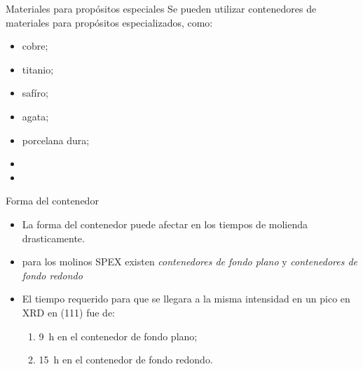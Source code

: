 \documentclass[%
spanish,
progressbar=head,
background=dark,
subsectionpage
]{beamer}
\begin{document}
\begin{frame}{Materiales para propósitos especiales}
    Se pueden utilizar contenedores de materiales para propósitos especializados, como:
    \begin{itemize}
        \item cobre;
        \item titanio;
        \item safíro;
        \item agata;
        \item porcelana dura;
        \item {}
        \item {}
    \end{itemize}
\end{frame}

\begin{frame}{Forma del contenedor}
\begin{itemize}
    \item La forma del contenedor puede afectar en los tiempos de molienda drasticamente.
    \item para los molinos SPEX existen \emph{contenedores de fondo plano} y \emph{contenedores de fondo redondo}
    \item El tiempo requerido para que se llegara a la misma intensidad en un pico en XRD en (111) fue de:
    \begin{enumerate}
        \item \qty{9}{\hour} en el contenedor de fondo plano;
        \item \qty{15}{\hour} en el contenedor de fondo redondo.
    \end{enumerate}
\end{itemize}
\end{frame}
\end{document}
